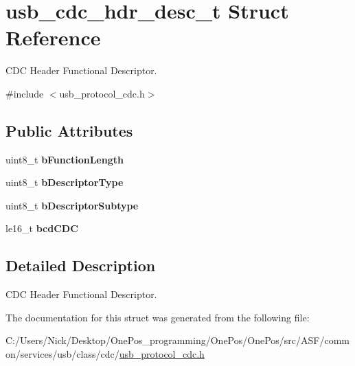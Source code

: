 \hypertarget{structusb__cdc__hdr__desc__t}{\section{usb\-\_\-cdc\-\_\-hdr\-\_\-desc\-\_\-t Struct Reference}
\label{structusb__cdc__hdr__desc__t}
}


C\-D\-C Header Functional Descriptor.  




{\ttfamily \#include $<$usb\-\_\-protocol\-\_\-cdc.\-h$>$}

\subsection*{Public Attributes}
\begin{DoxyCompactItemize}
\item 
\hypertarget{structusb__cdc__hdr__desc__t_a5cc7fd9ccd567771191345f2325f69f5}{uint8\-\_\-t {\bfseries b\-Function\-Length}}\label{structusb__cdc__hdr__desc__t_a5cc7fd9ccd567771191345f2325f69f5}

\item 
\hypertarget{structusb__cdc__hdr__desc__t_a2f64e8912373f4772be9cc268aff4336}{uint8\-\_\-t {\bfseries b\-Descriptor\-Type}}\label{structusb__cdc__hdr__desc__t_a2f64e8912373f4772be9cc268aff4336}

\item 
\hypertarget{structusb__cdc__hdr__desc__t_af15117c083f8811053fc398afc26b1bf}{uint8\-\_\-t {\bfseries b\-Descriptor\-Subtype}}\label{structusb__cdc__hdr__desc__t_af15117c083f8811053fc398afc26b1bf}

\item 
\hypertarget{structusb__cdc__hdr__desc__t_a6882eb0096f4d386031baab86bec8774}{le16\-\_\-t {\bfseries bcd\-C\-D\-C}}\label{structusb__cdc__hdr__desc__t_a6882eb0096f4d386031baab86bec8774}

\end{DoxyCompactItemize}


\subsection{Detailed Description}
C\-D\-C Header Functional Descriptor. 

The documentation for this struct was generated from the following file\-:\begin{DoxyCompactItemize}
\item 
C\-:/\-Users/\-Nick/\-Desktop/\-One\-Pos\-\_\-programming/\-One\-Pos/\-One\-Pos/src/\-A\-S\-F/common/services/usb/class/cdc/\hyperlink{usb__protocol__cdc_8h}{usb\-\_\-protocol\-\_\-cdc.\-h}\end{DoxyCompactItemize}
